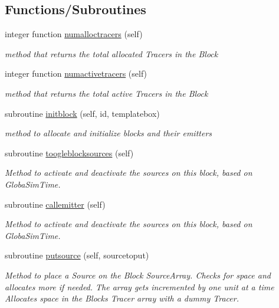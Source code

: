 \subsection*{Functions/\+Subroutines}
\begin{DoxyCompactItemize}
\item 
integer function \mbox{\hyperlink{namespaceblocks__mod_a7202fad0fdc07ff9111e61e3aa513af9}{numalloctracers}} (self)
\begin{DoxyCompactList}\small\item\em method that returns the total allocated Tracers in the Block \end{DoxyCompactList}\item 
integer function \mbox{\hyperlink{namespaceblocks__mod_ad8d0816321fe15e1b1e66eacdaaa10e1}{numactivetracers}} (self)
\begin{DoxyCompactList}\small\item\em method that returns the total active Tracers in the Block \end{DoxyCompactList}\item 
subroutine \mbox{\hyperlink{namespaceblocks__mod_a534ca69b17b6f54ee07f995b02feff39}{initblock}} (self, id, templatebox)
\begin{DoxyCompactList}\small\item\em method to allocate and initialize blocks and their emitters \end{DoxyCompactList}\item 
subroutine \mbox{\hyperlink{namespaceblocks__mod_ab9e57cbf0103b632b2b2dfa4e4d4139c}{toogleblocksources}} (self)
\begin{DoxyCompactList}\small\item\em Method to activate and deactivate the sources on this block, based on GlobaSim\+Time. \end{DoxyCompactList}\item 
subroutine \mbox{\hyperlink{namespaceblocks__mod_a2c3cf5113e1422d812c2c869afde2729}{callemitter}} (self)
\begin{DoxyCompactList}\small\item\em Method to activate and deactivate the sources on this block, based on GlobaSim\+Time. \end{DoxyCompactList}\item 
subroutine \mbox{\hyperlink{namespaceblocks__mod_a5d11f4958d950c7f436c040bc4133ea0}{putsource}} (self, sourcetoput)
\begin{DoxyCompactList}\small\item\em Method to place a Source on the Block Source\+Array. Checks for space and allocates more if needed. The array gets incremented by one unit at a time Allocates space in the Blocks Tracer array with a dummy Tracer. \end{DoxyCompactList}\item 

\end{DoxyCompactItemize}
